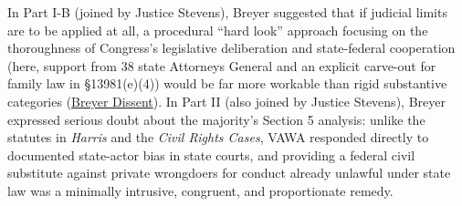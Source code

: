 \documentclass[12pt]{article}
\begin{document}
In Part I-B (joined by Justice Stevens), Breyer suggested that if judicial limits are to be applied at all, a procedural ``hard look'' approach focusing on the thoroughness of Congress's legislative deliberation and state-federal cooperation (here, support from 38 state Attorneys General and an explicit carve-out for family law in \S 13981(e)(4)) would be far more workable than rigid substantive categories (\href{https://www.law.cornell.edu/supct/html/99-5.ZD1.html}{Breyer Dissent}). In Part II (also joined by Justice Stevens), Breyer expressed serious doubt about the majority's Section 5 analysis: unlike the statutes in \textit{Harris} and the \textit{Civil Rights Cases}, VAWA responded directly to documented state-actor bias in state courts, and providing a federal civil substitute against private wrongdoers for conduct already unlawful under state law was a minimally intrusive, congruent, and proportionate remedy.
\end{document}
